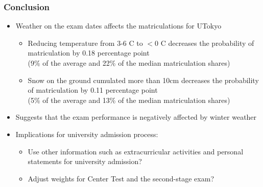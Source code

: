 \documentclass[10pt, pdfmx,hiresbb]{beamer}
\begin{document}
\begin{frame}\frametitle{Conclusion}
  \begin{itemize}
    \item Weather on the exam dates affects the matriculations for UTokyo
      \begin{itemize}
        \item Reducing temperature from 3-6 \degree C to $<$0 \degree C decreases the probability of matriculation by 0.18 percentage point \\
          (9\% of the average and 22\% of the median matriculation shares)
        \item Snow on the ground cumulated more than 10cm decreases the probability of matriculation by 0.11 percentage point \\
          (5\% of the average and 13\% of the median matriculation shares)
      \end{itemize}
    \item Suggests that the exam performance is negatively affected by winter weather
    \item Implications for university admission process:
      \begin{itemize}
        \item Use other information such as extracurricular activities and personal statements for university admission?
        \item Adjust weights for Center Test and the second-stage exam?
      \end{itemize}
  \end{itemize}
\end{frame}

\appendix
\end{document}
